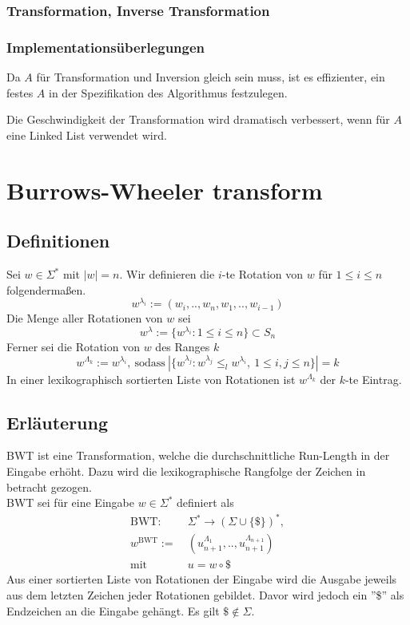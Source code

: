 \documentclass{article}
\begin{document}
\subsubsection{Transformation, Inverse Transformation}

\subsubsection{Implementationsüberlegungen}
Da $A$ für Transformation und Inversion gleich sein muss, ist es effizienter, ein festes $A$ in der Spezifikation des Algorithmus festzulegen.

Die Geschwindigkeit der Transformation wird dramatisch verbessert, wenn für $A$ eine Linked List verwendet wird.
\newpage
\section{Burrows-Wheeler transform}
\subsection{Definitionen}
Sei $w\in\Sigma^*$ mit $|w|=n$. Wir definieren die $i$-te Rotation von $w$ für $1\leq i\leq n$ folgendermaßen.
\begin{equation}
    w^{\lambda_i}:=(w_i,..,w_n,w_1,..,w_{i-1})
\end{equation}
Die Menge aller Rotationen von $w$ sei
\begin{equation}
    w^\lambda:=\{w^{\lambda_i}:1\leq i\leq n\}\subset S_n
\end{equation}
Ferner sei die Rotation von $w$ des Ranges $k$
\begin{equation}
    w^{\Lambda_k}:=w^{\lambda_i},~\text{sodass}~|\{w^{\lambda_j}:w^{\lambda_j}\leq_l w^{\lambda_i},~1\leq i,j\leq n\}|=k
\end{equation}
In einer lexikographisch sortierten Liste von Rotationen ist $w^{\Lambda_k}$ der $k$-te Eintrag.
\subsection{Erläuterung}
BWT ist eine Transformation, welche die durchschnittliche Run-Length in der Eingabe erhöht. Dazu wird die lexikographische Rangfolge der Zeichen in betracht gezogen.
\\[.5cm]
BWT sei für eine Eingabe $w\in\Sigma^*$ definiert als
\begin{equation}
\begin{split}
    \text{BWT}:~&\Sigma^*\rightarrow(\Sigma\cup\{\$\})^*,\\
    w^\text{BWT}:=~&(u^{\Lambda_1}_{n+1},..,u^{\Lambda_{n+1}}_{n+1})\\
    \text{mit}~&u=w\circ\$
\end{split}
\end{equation}
Aus einer sortierten Liste von Rotationen der Eingabe wird die Ausgabe jeweils aus dem letzten Zeichen jeder Rotationen gebildet. Davor wird jedoch ein ''\$'' als Endzeichen an die Eingabe gehängt. Es gilt $\$\not\in\Sigma$.
\end{document}
